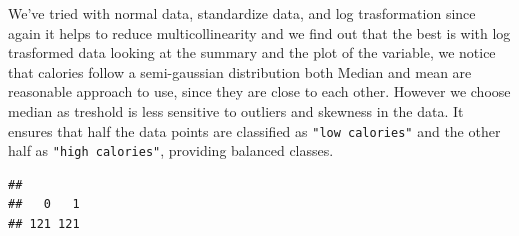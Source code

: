 \documentclass[
]{article}
\newenvironment{Shaded}{\begin{snugshade}}{\end{snugshade}}
\newcommand{\CommentTok}[1]{\textcolor[rgb]{0.56,0.35,0.01}{\textit{#1}}}
\newcommand{\DecValTok}[1]{\textcolor[rgb]{0.00,0.00,0.81}{#1}}
\newcommand{\FunctionTok}[1]{\textcolor[rgb]{0.13,0.29,0.53}{\textbf{#1}}}
\newcommand{\NormalTok}[1]{#1}
\newcommand{\OtherTok}[1]{\textcolor[rgb]{0.56,0.35,0.01}{#1}}
\newcommand{\SpecialCharTok}[1]{\textcolor[rgb]{0.81,0.36,0.00}{\textbf{#1}}}
\begin{document}
We've tried with normal data, standardize data, and log trasformation
since again it helps to reduce multicollinearity and we find out that
the best is with log trasformed data looking at the summary and the plot
of the variable, we notice that calories follow a semi-gaussian
distribution both Median and mean are reasonable approach to use, since
they are close to each other. However we choose median as treshold is
less sensitive to outliers and skewness in the data. It ensures that
half the data points are classified as \texttt{"low\ calories"} and the
other half as \texttt{"high\ calories"}, providing balanced classes.

\begin{Shaded}
\end{Shaded}

\begin{verbatim}
## 
##   0   1 
## 121 121
\end{verbatim}
\end{document}
